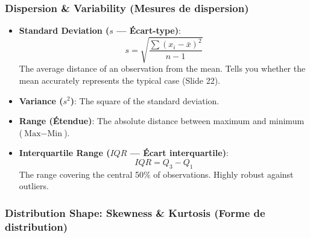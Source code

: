 \documentclass[
]{article}
\providecommand{\tightlist}{%
  \setlength{\itemsep}{0pt}\setlength{\parskip}{0pt}}
\begin{document}
\subsubsection{Dispersion \& Variability (Mesures de
dispersion)}\label{dispersion-variability-mesures-de-dispersion}

\begin{itemize}
\tightlist
\item
  \textbf{Standard Deviation (\(s\) --- Écart-type)}:
  \[s = \sqrt{\frac{\sum (x_i - \bar{x})^2}{n - 1}}\] The average
  distance of an observation from the mean. Tells you whether the mean
  accurately represents the typical case (Slide 22).
\item
  \textbf{Variance (\(s^2\))}: The square of the standard deviation.
\item
  \textbf{Range (Étendue)}: The absolute distance between maximum and
  minimum (\(\text{Max} - \text{Min}\)).
\item
  \textbf{Interquartile Range (\(IQR\) --- Écart interquartile)}:
  \[IQR = Q_3 - Q_1\] The range covering the central 50\% of
  observations. Highly robust against outliers.
\end{itemize}

\subsubsection{Distribution Shape: Skewness \& Kurtosis (Forme de
distribution)}\label{distribution-shape-skewness-kurtosis-forme-de-distribution}
\end{document}
